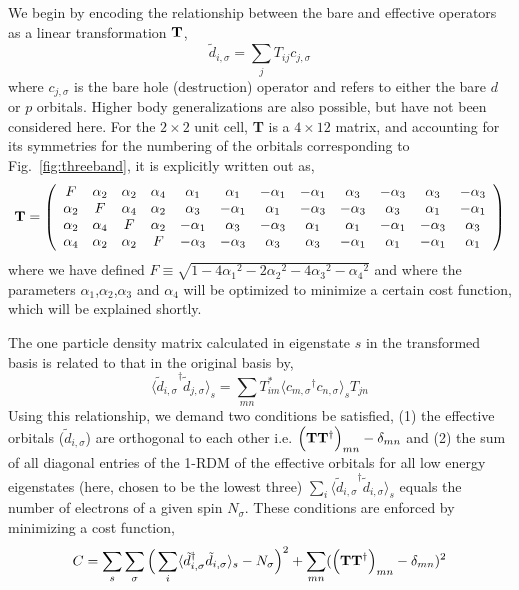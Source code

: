 We begin by encoding the relationship between the bare and effective operators as a linear transformation ${\bf T}$, 
\begin{equation}
	\tilde{d}_{i,\sigma} = \sum_{j} T_{ij} c_{j,\sigma}
\end{equation}
where $c_{j,\sigma}$ is the bare hole (destruction) operator and refers to either the bare $d$ or $p$ orbitals. 
Higher body generalizations are also possible, but have not been considered here. 
For the $2\times2$ unit cell, {\bf T} is a $4 \times 12 $ matrix, and accounting for its symmetries 
for the numbering of the orbitals corresponding to Fig.~\ref{fig:threeband}, it is explicitly written out as, 
\begin{eqnarray}
{\bf T} = 
\left(
\begin{array}{cccccccccccc}
F        & \alpha_2 &        \alpha_2 &  \alpha_4 & \alpha_1 & \alpha_1 & -\alpha_1 & -\alpha_1 & \alpha_3 & -\alpha_3 & \alpha_3 & -\alpha_3 \\
\alpha_2 &  F       &        \alpha_4 &  \alpha_2 & \alpha_3 & -\alpha_1 & \alpha_1 & -\alpha_3 & -\alpha_3 & \alpha_3 & \alpha_1 & -\alpha_1 \\
\alpha_2 & \alpha_4 & F               &  \alpha_2 & -\alpha_1 & \alpha_3 & -\alpha_3 & \alpha_1 & \alpha_1 & -\alpha_1 & -\alpha_3 & \alpha_3 \\
\alpha_4 & \alpha_2 & \alpha_2        &   F       & -\alpha_3 & -\alpha_3 & \alpha_3 & \alpha_3 & -\alpha_1 & \alpha_1 & -\alpha_1 & \alpha_1 \\
\end{array}
\right)
\end{eqnarray}
where we have defined $F \equiv \sqrt{1-4{\alpha_1}^2 - 2{\alpha_2}^2 - 4 {\alpha_3}^2 -{\alpha_4}^2}$ and 
where the parameters $\alpha_1$,$\alpha_2$,$\alpha_3$ and $\alpha_4$ will be optimized to minimize a 
certain cost function, which will be explained shortly. 

The one particle density matrix calculated in eigenstate $s$ in the transformed basis is related to that in the original basis by,
\begin{equation}
	\langle {\tilde{d}_{i,\sigma}}^{\dagger} \tilde{d}_{j,\sigma} \rangle_{s} = \sum_{mn} T^{*}_{im} \langle {c_{m,\sigma}}^{\dagger} c_{n,\sigma} \rangle_{s} T_{jn}
\end{equation}
Using this relationship, we demand two conditions be satisfied, (1) the effective orbitals ($\tilde{d}_{i,\sigma}$) 
are orthogonal to each other 
i.e. $\Big({\bf T} {\bf T}^{\dagger}\Big)_{mn} -\delta_{mn}$
and (2) the sum of all diagonal entries of the 1-RDM of the effective orbitals for all low energy eigenstates 
(here, chosen to be the lowest three) $\sum_{i} \langle {\tilde{d}_{i,\sigma}}^{\dagger} \tilde{d}_{i,\sigma} \rangle_{s}$ 
equals the number of electrons of a given spin $N_{\sigma}$. 
These conditions are enforced by minimizing a cost function,
\begin{equation}
C = \sum_{s} \sum_{\sigma} \Big( \sum_{i} \langle \tilde{d}_{i,\sigma}^{\dagger} \tilde{d}_{i,\sigma} \rangle_{s} - N_{\sigma} \Big)^{2} + \sum_{mn} ( \Big({\bf T} {\bf T}^{\dagger}\Big)_{mn} -\delta_{mn})^{2}
\label{eq:C}
\end{equation} 

